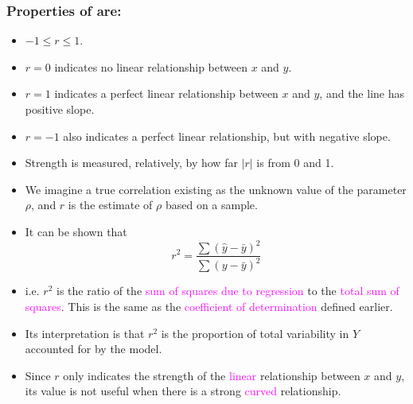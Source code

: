 \documentclass[xcolor=dvipsnames,12pt]{beamer}
\begin{document}
\begin{frame}
\frametitle{Properties of  are:}
\begin{itemize}
\item $-1 \leq r \leq 1$. 
\item $r=0$ indicates no linear relationship between $x$ and $y$. 
\item $r=1$ indicates a perfect linear relationship between $x$ and $y$, and the line has
positive slope. 
\item $r=-1$ also indicates a perfect linear relationship, but with negative slope. 
\item Strength is measured, relatively, by how far $|r|$ is from 0 and 1.
\item  We imagine a true correlation existing as the unknown value of the parameter $\rho$,
      and $r$ is the estimate of $\rho$ based on a sample.
\end{itemize}
\end{frame}
 



\begin{frame}
\begin{itemize}  
\item It can be shown that
$$
  r^2 = \frac{\sum(\hat{y}-\bar{y})^2}{\sum(y-\bar{y})^2} 
  $$
\item i.e.  $r^2$ is the ratio of the \textcolor{magenta}{sum of squares due to regression} to the  \textcolor{magenta}{total sum of squares}. This
is the same as the  \textcolor{magenta}{coefficient of determination} defined
earlier.\\[.05in]
\item  Its interpretation is that $r^2$ is the proportion of total
variability in $Y$ accounted for by the model.\\[.05in]
\item Since $r$ only indicates the strength of the \textcolor{magenta}{linear}
relationship between $x$ and $y$, its value is not useful
when there is a strong \textcolor{magenta}{curved} relationship.
\end{itemize}
\end{frame}
\end{document}
